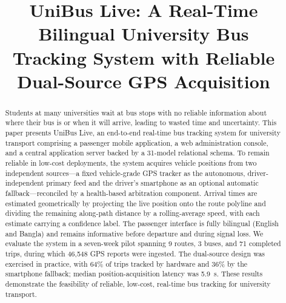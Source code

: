 \documentclass[conference]{IEEEtran}
\begin{document}
\title{UniBus Live: A Real-Time Bilingual University Bus\\
Tracking System with Reliable Dual-Source GPS Acquisition}

\author{
}
\maketitle

\begin{abstract}
Students at many universities wait at bus stops with no reliable
information about where their bus is or when it will arrive, leading to
wasted time and uncertainty. This paper presents UniBus Live, an
end-to-end real-time bus tracking system for university transport
comprising a passenger mobile application, a web administration console,
and a central application server backed by a 31-model relational schema.
To remain reliable in low-cost deployments, the system acquires vehicle
positions from two independent sources---a fixed vehicle-grade GPS tracker
as the autonomous, driver-independent primary feed and the driver's
smartphone as an optional automatic fallback---reconciled by a health-based
arbitration component. Arrival
times are estimated geometrically by projecting the live position onto the
route polyline and dividing the remaining along-path distance by a
rolling-average speed, with each estimate carrying a confidence label. The
passenger interface is fully bilingual (English and Bangla) and remains
informative before departure and during signal loss. We evaluate the
system in a seven-week pilot spanning 9 routes, 3 buses, and 71 completed
trips, during which 46{,}548 GPS reports were ingested. The dual-source
design was exercised in practice, with 64\% of trips tracked by hardware
and 36\% by the smartphone fallback; median position-acquisition latency
was 5.9~s. These results demonstrate the feasibility of reliable,
low-cost, real-time bus tracking for university transport.
\end{abstract}
\end{document}
